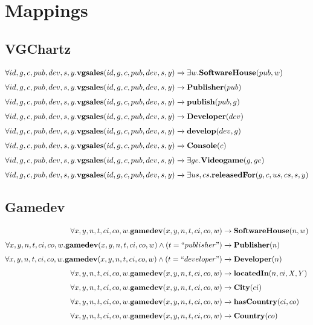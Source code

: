 \section*{Mappings}

\subsection*{VGChartz}
\begin{subequations}
	\begin{align}
	\forall id,g,c,pub,dev,s,y.\textbf{vgsales}(id,g,c,pub,dev,s,y)&\alignarrow \exists w.\textbf{SoftwareHouse}(pub,w) \\[4pt]
	\forall id,g,c,pub,dev,s,y.\textbf{vgsales}(id,g,c,pub,dev,s,y)&\alignarrow \textbf{Publisher}(pub) \\[4pt]
	\forall id,g,c,pub,dev,s,y.\textbf{vgsales}(id,g,c,pub,dev,s,y)&\alignarrow \textbf{publish}(pub,g) \\[4pt]
	\forall id,g,c,pub,dev,s,y.\textbf{vgsales}(id,g,c,pub,dev,s,y)&\alignarrow \textbf{Developer}(dev) \\[4pt]
	\forall id,g,c,pub,dev,s,y.\textbf{vgsales}(id,g,c,pub,dev,s,y)&\alignarrow \textbf{develop}(dev,g) \\[4pt]
	\forall id,g,c,pub,dev,s,y.\textbf{vgsales}(id,g,c,pub,dev,s,y)&\alignarrow \textbf{Console}(c) \\[4pt]
	\forall id,g,c,pub,dev,s,y.\textbf{vgsales}(id,g,c,pub,dev,s,y)&\alignarrow \exists ge.\textbf{Videogame}(g,ge) \\[4pt]
	\forall id,g,c,pub,dev,s,y.\textbf{vgsales}(id,g,c,pub,dev,s,y)&\alignarrow \exists us,cs.\textbf{releasedFor}(g,c,us,cs,s,y)
	\end{align}
\end{subequations}

\subsection*{Gamedev}
\begin{subequations}
	\begin{align}
	\forall x,y,n,t,ci,co,w.\textbf{gamedev}(x, y, n, t, ci, co, w) &\alignarrow \textbf{SoftwareHouse}(n,w) \\[4pt]
	\forall x,y,n,t,ci,co,w.\textbf{gamedev}(x, y, n, t, ci, co, w) \land (t = ``publisher") &\alignarrow \textbf{Publisher}(n) \\[4pt]
	\forall x,y,n,t,ci,co,w.\textbf{gamedev}(x, y, n, t, ci, co, w) \land (t = ``developer") &\alignarrow \textbf{Developer}(n) \\[4pt]
	\forall x,y,n,t,ci,co,w.\textbf{gamedev}(x, y, n, t, ci, co, w) &\alignarrow \textbf{locatedIn}(n,ci, X, Y) \\[4pt]
	\forall x,y,n,t,ci,co,w.\textbf{gamedev}(x, y, n, t, ci, co, w) &\alignarrow \textbf{City}(ci) \\[4pt]
	\forall x,y,n,t,ci,co,w.\textbf{gamedev}(x, y, n, t, ci, co, w) &\alignarrow \textbf{hasCountry}(ci, co) \\[4pt]
	\forall x,y,n,t,ci,co,w.\textbf{gamedev}(x, y, n, t, ci, co, w) &\alignarrow \textbf{Country}(co)
	\end{align}
\end{subequations}

